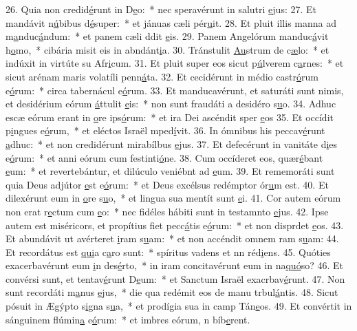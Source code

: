 26. Quia non credid\uline{é}runt in D\uline{e}o:~* nec speravérunt in salutri \uline{e}jus:
27. Et mandávit n\uline{ú}bibus d\uline{é}super:~* et jánuas cæli pér\uline{u}it.
28. Et pluit illis manna ad m\uline{a}nduc\uline{á}ndum:~* et panem cæli ddit \uline{e}is.
29. Panem Angelórum manduc\uline{á}vit h\uline{o}mo,~* cibária misit eis in abndánt\uline{i}a.
30. Tránstulit \uline{Au}strum de c\uline{æ}lo:~* et indúxit in virtúte su Afr\uline{i}cum.
31. Et pluit super eos sicut p\uline{ú}lverem c\uline{a}rnes:~* et sicut arénam maris volatíli penn\uline{á}ta.
32. Et cecidérunt in médio castr\uline{ó}rum e\uline{ó}rum:~* circa tabernácul e\uline{ó}rum.
33. Et manducavérunt, et saturáti sunt nimis, et desidérium eórum \uline{á}ttulit \uline{e}is:~* non sunt fraudáti a desidéro s\uline{u}o.
34. Adhuc escæ eórum erant in \uline{o}re ips\uline{ó}rum:~* et ira Dei ascéndit sper \uline{e}os
35. Et occídit p\uline{i}ngues e\uline{ó}rum,~* et eléctos Israël mped\uline{í}vit.
36. In ómnibus his peccav\uline{é}runt \uline{a}dhuc:~* et non credidérunt mirabílbus \uline{e}jus.
37. Et defecérunt in vanitáte d\uline{i}es e\uline{ó}rum:~* et anni eórum cum festinti\uline{ó}ne.
38. Cum occíderet eos, quær\uline{é}bant \uline{e}um:~* et revertebántur, et dilúculo veniébnt ad \uline{e}um.
39. Et rememoráti sunt quia Deus adjútor \uline{e}st e\uline{ó}rum:~* et Deus excélsus redémptor ór\uline{u}m est.
40. Et dilexérunt eum in \uline{o}re s\uline{u}o,~* et lingua sua mentít sunt \uline{e}i.
41. Cor autem eórum non erat r\uline{e}ctum cum \uline{e}o:~* nec fidéles hábiti sunt in testamnto \uline{e}jus.
42. Ipse autem est miséricors, et propítius fiet pecc\uline{á}tis e\uline{ó}rum:~* et non disprdet \uline{e}os.
43. Et abundávit ut avérteret \uline{i}ram s\uline{u}am:~* et non accéndit omnem ram s\uline{u}am:
44. Et recordátus est \uline{qui}a c\uline{a}ro sunt:~* spíritus vadens et nn réd\uline{i}ens.
45. Quóties exacerbavérunt eum \uline{i}n des\uline{é}rto,~* in iram concitavérunt eum in na\uline{quó}so?
46. Et convérsi sunt, et tentav\uline{é}runt D\uline{e}um:~* et Sanctum Israël exacrbav\uline{é}runt.
47. Non sunt recordáti m\uline{a}nus \uline{e}jus,~* die qua redémit eos de manu trbul\uline{á}ntis.
48. Sicut pósuit in Ægýpto s\uline{i}gna s\uline{u}a,~* et prodígia sua in camp Tán\uline{e}os.
49. Et convértit in sánguinem flúmin\uline{a} e\uline{ó}rum:~* et imbres eórum, n bíb\uline{e}rent.

